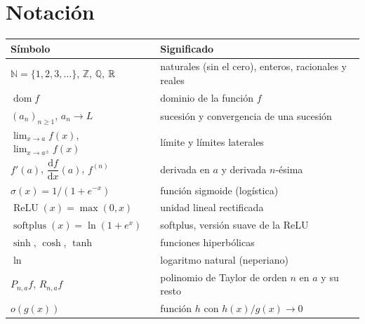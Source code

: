 \documentclass[11pt,a4paper,twoside,openany]{book}
\newcommand{\N}{\mathbb{N}}
\newcommand{\Z}{\mathbb{Z}}
\newcommand{\Q}{\mathbb{Q}}
\newcommand{\dom}{\operatorname{dom}}
\newcommand{\ReLU}{\operatorname{ReLU}}
\newcommand{\softplus}{\operatorname{softplus}}
\newcommand{\dd}{\mathrm{d}}
\begin{document}
\section*{Notación}
\begin{center}
\small
\begin{tabular}{@{}ll@{}}
\toprule
Símbolo & Significado \\
\midrule
$\N=\{1,2,3,\dots\}$, $\Z$, $\Q$, $\mathbb{R}$ & naturales (sin el cero), enteros, racionales y reales \\
$\dom f$ & dominio de la función $f$ \\
$(a_n)_{n\ge1}$, $a_n\to L$ & sucesión y convergencia de una sucesión \\
$\lim_{x\to a}f(x)$, $\lim_{x\to a^{\pm}}f(x)$ & límite y límites laterales \\
$f'(a)$, $\dfrac{\dd f}{\dd x}(a)$, $f^{(n)}$ & derivada en $a$ y derivada $n$-ésima \\
$\sigma(x)=1/(1+e^{-x})$ & función sigmoide (logística) \\
$\ReLU(x)=\max(0,x)$ & unidad lineal rectificada \\
$\softplus(x)=\ln(1+e^{x})$ & softplus, versión suave de la ReLU \\
$\sinh$, $\cosh$, $\tanh$ & funciones hiperbólicas \\
$\ln$ & logaritmo natural (neperiano) \\
$P_{n,a}f$, $R_{n,a}f$ & polinomio de Taylor de orden $n$ en $a$ y su resto \\
$o(g(x))$ & función $h$ con $h(x)/g(x)\to0$ \\
\bottomrule
\end{tabular}
\end{center}

\tableofcontents

\mainmatter







\appendix


\backmatter

\end{document}
